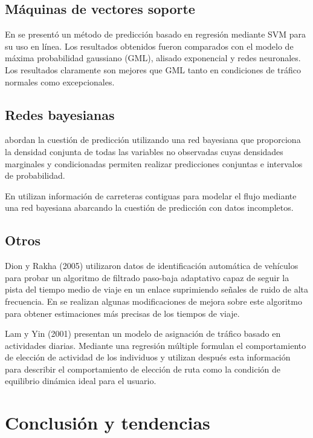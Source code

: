 \documentclass{llncs}
\begin{document}
\subsection{Máquinas de vectores soporte}

En \cite{castro2009online} se presentó un método de predicción basado en regresión mediante SVM para su uso en línea. Los resultados obtenidos fueron comparados con el modelo de máxima probabilidad gaussiano (GML), alisado exponencial y redes neuronales. Los resultados claramente son mejores que GML tanto en condiciones de tráfico normales como excepcionales.


\subsection{Redes bayesianas}
\cite{castillo2008predicting} abordan la cuestión de predicción utilizando una red bayesiana que proporciona la densidad conjunta de todas las variables no observadas cuyas densidades marginales y condicionadas permiten realizar predicciones conjuntas e intervalos de probabilidad.

En \cite{sun2006bayesian} utilizan información de carreteras contiguas para modelar el flujo mediante una red bayesiana abarcando la cuestión de predicción con datos incompletos.


\subsection{Otros}

Dion y Rakha (2005) \cite{dion2006estimating} utilizaron datos de identificación automática de vehículos para probar un algoritmo de filtrado paso-baja adaptativo capaz de seguir la pista del tiempo medio de viaje en un enlace suprimiendo señales de ruido de alta frecuencia.
En \cite{tam2008using} se realizan algunas modificaciones de mejora sobre este algoritmo para obtener estimaciones más precisas de los tiempos de viaje.

Lam y Yin (2001) \cite{lam2001activity} presentan un modelo de asignación de tráfico basado en actividades diarias. Mediante una regresión múltiple formulan el comportamiento de elección de actividad de los individuos y utilizan después esta información para describir el comportamiento de elección de ruta como la condición de equilibrio dinámica ideal para el usuario.


\section{Conclusión y tendencias}
\end{document}
